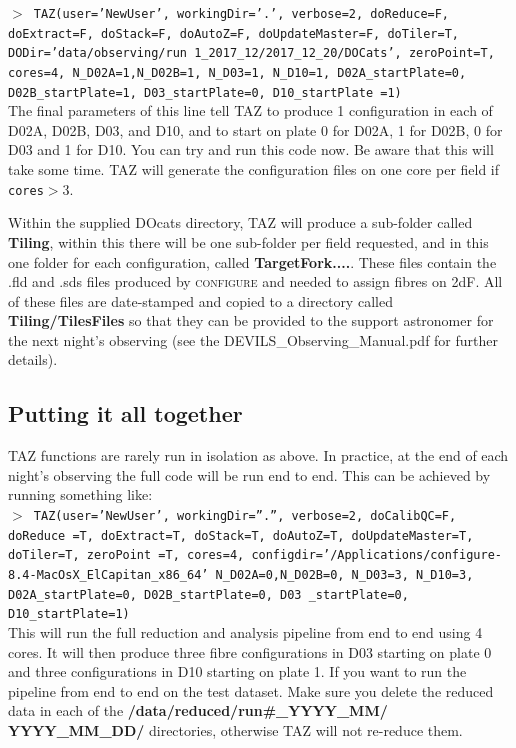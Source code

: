 \documentclass[12pt]{article}
\begin{document}
  \hspace{10mm} \texttt{$>$ TAZ(user='NewUser', workingDir='.', verbose=2, doReduce=F, doExtract=F, doStack=F, doAutoZ=F, doUpdateMaster=F, doTiler=T, DODir='data/observing/run 1\_2017\_12/2017\_12\_20/DOCats', zeroPoint=T,  cores=4,  N\_D02A=1,N\_D02B=1, N\_D03=1, N\_D10=1, D02A\_startPlate=0, D02B\_startPlate=1, D03\_startPlate=0, D10\_startPlate =1)}\\  
 
 The final parameters of this line tell TAZ to produce 1 configuration in each of D02A, D02B, D03, and D10, and to start on plate 0 for D02A, 1 for D02B, 0 for D03 and 1 for D10. You can try and run this code now. Be aware that this will take some time. TAZ will generate the configuration files on one core per field if \texttt{cores}$>$3. 
 
 Within the supplied DOcats directory, TAZ will produce a sub-folder called \textbf{Tiling}, within this there will be one sub-folder per field requested, and in this one folder for each configuration, called \textbf{TargetFork....}. These files contain the .fld and .sds files produced by \textsc{configure} and needed to assign fibres on 2dF. All of these files are date-stamped and copied to a directory called  \textbf{Tiling/TilesFiles}  so that they can be provided to the support astronomer for the next night's observing (see the DEVILS\_Observing\_Manual.pdf for further details). 
 
 
 \subsection{Putting it all together}
 
 TAZ functions are rarely run in isolation as above. In practice, at the end of each night's observing the full code will be run end to end. This can be achieved by running something like: \\
 
  \hspace{10mm} \texttt{$>$  TAZ(user='NewUser', workingDir=''.'', verbose=2,  doCalibQC=F, doReduce =T, doExtract=T, doStack=T,  doAutoZ=T,  doUpdateMaster=T, doTiler=T, zeroPoint =T, cores=4, configdir='/Applications/configure-8.4-MacOsX\_ElCapitan\_x86\_64' N\_D02A=0,N\_D02B=0, N\_D03=3, N\_D10=3, D02A\_startPlate=0, D02B\_startPlate=0, D03 \_startPlate=0, D10\_startPlate=1)}\\

This will run the full reduction and analysis pipeline from end to end using 4 cores. It will then produce three fibre configurations in D03 starting on plate 0 and three configurations in D10 starting on plate 1. If you want to run the pipeline from end to end on the test dataset. Make sure you delete the reduced data in each of the  \textbf{/data/reduced/run\#\_YYYY\_MM/ \\ YYYY\_MM\_DD/} directories, otherwise TAZ will not re-reduce them. 
\end{document}

